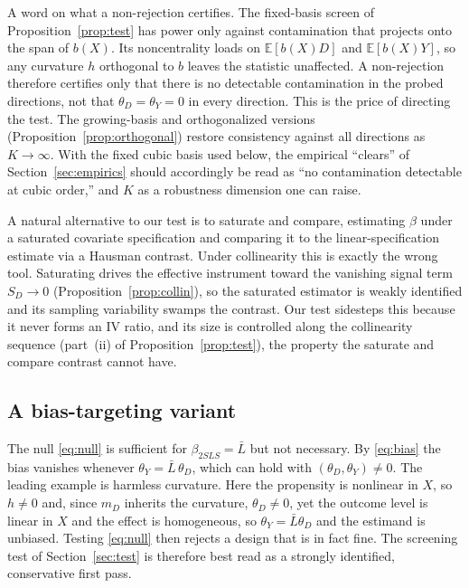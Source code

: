 \documentclass[preprint,11pt,authoryear]{elsarticle}
\theoremstyle{definition}
\newcommand{\E}{\mathbb{E}}
\begin{document}
A word on what a non-rejection certifies. The fixed-basis screen of
Proposition~\ref{prop:test} has power only against contamination that projects onto the
span of $b(X)$. Its noncentrality loads on $\E[b(X)D]$ and $\E[b(X)Y]$, so any curvature
$h$ orthogonal to $b$ leaves the statistic unaffected. A non-rejection therefore certifies
only that there is no detectable contamination in the probed directions, not that
$\theta_D=\theta_Y=0$ in every direction. This is the price of directing the test. The
growing-basis and orthogonalized versions (Proposition~\ref{prop:orthogonal}) restore
consistency against all directions as $K\to\infty$. With the fixed cubic basis used below,
the empirical ``clears'' of Section~\ref{sec:empirics} should accordingly be read as ``no
contamination detectable at cubic order,'' and $K$ as a robustness dimension one can
raise.

A natural alternative to our test is to saturate and compare, estimating
$\beta$ under a saturated covariate specification and comparing it to the
linear-specification estimate via a Hausman contrast. Under collinearity this is exactly
the wrong tool. Saturating drives the effective instrument toward the vanishing signal
term $S_D\to0$ (Proposition~\ref{prop:collin}), so the saturated estimator is weakly
identified and its sampling variability swamps the contrast. Our test sidesteps this
because it never forms an IV ratio, and its size is controlled along the collinearity
sequence (part~(ii) of Proposition~\ref{prop:test}), the property the saturate and compare
contrast cannot have.

\subsection{A bias-targeting variant}\label{sec:exact}

The null \eqref{eq:null} is sufficient for $\beta_{2SLS}=\bar L$ but not
necessary. By \eqref{eq:bias} the bias vanishes whenever
$\theta_Y=\bar L\,\theta_D$, which can hold with $(\theta_D,\theta_Y)\neq0$. The
leading example is harmless curvature. Here the propensity is nonlinear in
$X$, so $h\neq0$ and, since $m_D$ inherits the curvature, $\theta_D\neq0$, yet the
outcome level is linear in $X$ and the effect is homogeneous, so
$\theta_Y=\bar L\theta_D$ and the estimand is unbiased. Testing \eqref{eq:null}
then rejects a design that is in fact fine. The screening test of
Section~\ref{sec:test} is therefore best read as a strongly identified,
conservative first pass.
\end{document}
